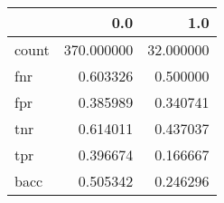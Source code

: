 \begin{tabular}{lrr}
\toprule
{} &         0.0 &        1.0 \\
\midrule
count &  370.000000 &  32.000000 \\
fnr   &    0.603326 &   0.500000 \\
fpr   &    0.385989 &   0.340741 \\
tnr   &    0.614011 &   0.437037 \\
tpr   &    0.396674 &   0.166667 \\
bacc  &    0.505342 &   0.246296 \\
\bottomrule
\end{tabular}
